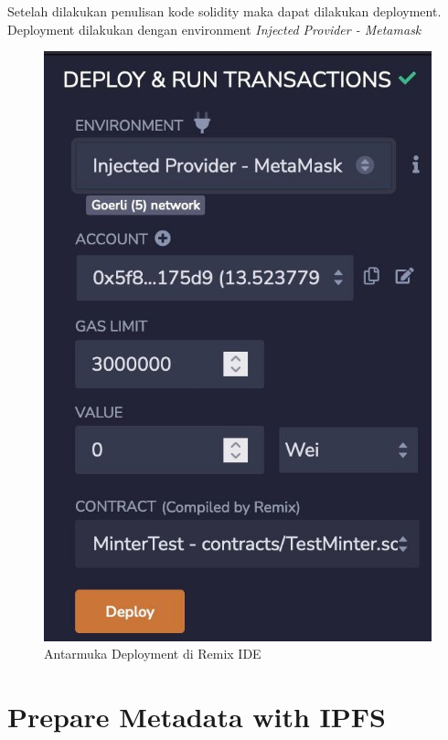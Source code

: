 Setelah dilakukan penulisan kode solidity maka dapat dilakukan deployment. Deployment dilakukan dengan environment \emph{Injected Provider - Metamask}


\begin{figure}[H]
  \centering

  \includegraphics[scale=0.4]{gambar/deployment-interface.jpg}

  \caption{Antarmuka Deployment di Remix IDE}
  \label{fig:deploymentinterface}
\end{figure}

\section{Prepare Metadata with IPFS}

